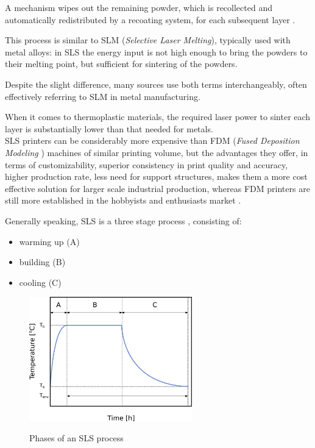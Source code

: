 \documentclass{article}
\begin{document}
    A mechanism wipes out the remaining powder, which is recollected and automatically redistributed by a recoating 
    system, for each subsequent layer \autocite*{Padovano_SLS_Review}. 

    This process is similar to SLM (\textit{Selective Laser Melting}), typically used with metal alloys: in SLS the energy input is not high enough 
    to bring the powders to their melting point, but sufficient for sintering of the powders. 

    Despite the slight difference, many sources use both terms interchangeably, often effectively referring to SLM in metal manufacturing. 
    
    When it comes to thermoplastic materials, the required laser power to sinter each layer is substantially lower than that needed for metals. \\ 

    SLS printers can be considerably more expensive than FDM (\textit{Fused Deposition Modeling} \footnotemark) machines of similar printing volume, but the advantages they offer, 
    in terms of customizability, superior consistency in print quality and accuracy, higher production rate, less need for support structures, 
    makes them a more cost effective solution for larger scale industrial production, whereas FDM printers are still more established 
    in the hobbyists and enthusiasts market \autocite*{Padovano_SLS_Review}. \\ 


    Generally speaking, SLS is a three stage process \autocites{Padovano_SLS_Review}, consisting of: 
    
    \begin{itemize}
        \item warming up (A)
        \item building (B)
        \item cooling (C)
    \end{itemize}

    \begin{figure}[h!]
        \centering
        \includegraphics[width=0.63\textwidth]{Pictures/SLS_temp_over_time.eps}\\
        \caption{Phases of an SLS process} 
        \label{fig:SLS_temp_over_time}
    \end{figure}
\end{document}

